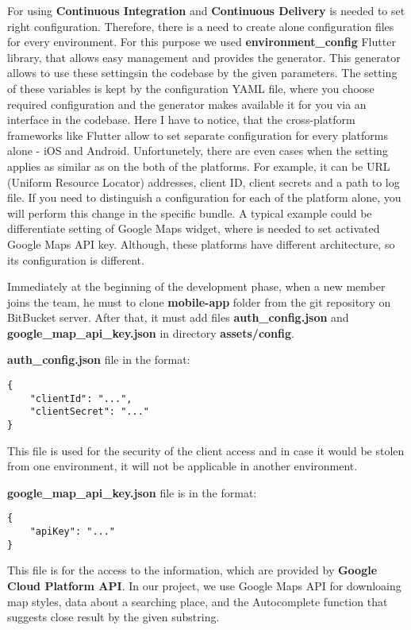 For using \textbf{Continuous Integration} and \textbf{Continuous Delivery} is needed to set right configuration.
Therefore, there is a need to create alone configuration files for every environment.
For this purpose we used \textbf{environment\_config} Flutter library, that allows easy management and provides the generator.
This generator allows to use these settingsin the codebase by the given parameters.
The setting of these variables is kept by the configuration YAML file, where you choose required configuration and the generator makes available it for you via an interface in the codebase.
Here I have to notice, that the cross-platform frameworks like Flutter allow to set separate configuration for every platforms alone - iOS and Android.
Unfortunetely, there are even cases when the setting applies as similar as on the both of the platforms.
For example, it can be URL (Uniform Resource Locator) addresses, client ID, client secrets and a path to log file.
If you need to distinguish a configuration for each of the platform alone, you will perform this change in the specific bundle.
A typical example could be differentiate setting of Google Maps widget, where is needed to set activated Google Maps API key.
Although, these platforms have different architecture, so its configuration is different.

Immediately at the beginning of the development phase, when a new member joins the team, he must to clone \textbf{mobile-app} folder from the git repository on BitBucket server.
After that, it must add files \textbf{auth\_config.json} and \textbf{google\_map\_api\_key.json} in directory \textbf{assets/config}.

\textbf{auth\_config.json} file in the format:
\begin{verbatim}
{
    "clientId": "...",
    "clientSecret": "..."
}
\end{verbatim}


This file is used for the security of the client access and in case it would be stolen from one environment, it will not be applicable in another environment.

\textbf{google\_map\_api\_key.json} file is in the format:
\begin{verbatim}
{
    "apiKey": "..."
}
\end{verbatim}

This file is for the access to the information, which are provided by \textbf{Google Cloud Platform API}.
In our project, we use Google Maps API for downloaing map styles, data about a searching place, and the Autocomplete function that suggests close result by the given substring.

